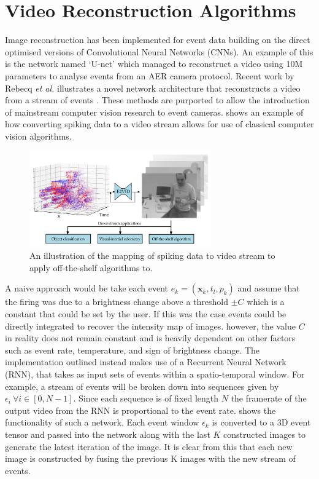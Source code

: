 \section{Video Reconstruction Algorithms} \label{ssec:video_reconstruction}

Image reconstruction has been implemented for event data building on the direct optimised versions of Convolutional Neural Networks (CNNs). An example of this is the network named `U-net'\cite{UNET} which managed to reconstruct a video using 10M parameters to analyse events from an AER camera protocol. Recent work by Rebecq \textit{et al.} illustrates a novel network architecture that reconstructs a video from a stream of events \cite{spikingToVideo}. These methods are purported to allow the introduction of mainstream computer vision research to event cameras.  shows an example of how converting spiking data to a video stream allows for use of classical computer vision algorithms.

\begin{figure}[htb]
      \centering
      \includegraphics[width=0.7\textwidth]{background/images/spikes_to_video.png}
      \caption{An illustration of the mapping of spiking data to video stream to apply off-the-shelf algorithms to\cite{spikingToVideo}.}
      \label{fig:spikes_to_video}
\end{figure}

A naive approach would be take each event $ e_k = (\boldsymbol{\mathbf{x}}_k, t_l, p_k ) $ and assume that the firing was due to a brightness change above a threshold $ \pm C $ which is a constant that could be set by the user. If this was the case events could be directly integrated to recover the intensity map of images. however, the value $ C $ in reality does not remain constant and is heavily dependent on other factors such as event rate, temperature, and sign of brightness change. The implementation outlined instead makes use of a Recurrent Neural Network (RNN), that takes as input sets of events within a spatio-temporal window. For example, a stream of events will be broken down into sequences given by $ \epsilon_i \: \forall i \in [0, N-1] $. Since each sequence is of fixed length $ N $ the framerate of the output video from the RNN is proportional to the event rate.  shows the functionality of such a network. Each event window $ \epsilon_k $ is converted to a 3D event tensor and passed into the network along with the last $ K $ constructed images to generate the latest iteration of the image. It is clear from this that each new image is constructed by fusing the previous K images with the new stream of events.

